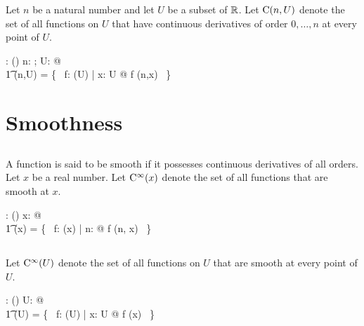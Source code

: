 \documentclass[11pt, oneside]{article}
\begin{document}
Let $n$ be a natural number and let $U$ be a subset of $\mathbb{R}$.
Let $\operatorname{C}(n,U)$ denote the set of all functions on $U$ that have continuous derivatives of order $0, \ldots, n$
at every point of $U$.

\begin{axdef}
	\CnPR: \nat \cross \power \R \fun \power(\R \pfun \R)
\where
	\forall n: \nat; U: \power \R @ \\
	\t1	\CnPR(n,U) = \{~ f: \FunPR(U) | \forall x: U @ f \in \CnR(n,x) ~\}
\end{axdef}

\section{Smoothness}

\subsection{}

A function is said to be smooth if it possesses continuous derivatives of all orders.
Let $x$ be a real number.
Let $\operatorname{C^{\infty}}(x)$ denote the set of all functions that are smooth at $x$.

\begin{axdef}
	\smoothR: \R \fun \power(\R \pfun \R)
\where
	\forall x: \R @ \\
	\t1	\smoothR(x) = \{~ f: \FunR(x) | \forall n: \nat @ f \in \CnR(n, x) ~\}
\end{axdef}

\subsection{}

Let $\operatorname{C^{\infty}}(U)$ denote the set of all functions on $U$ that are smooth at every point of $U$.

\begin{axdef}
	\smoothPR: \power \R \fun \power (\R \pfun \R)
\where
	\forall U: \power \R @ \\
	\t1	\smoothPR(U) = \{~ f: \FunPR(U) | \forall x: U @ f \in \smoothR(x) ~\}
\end{axdef}

\printbibliography
\end{document}
